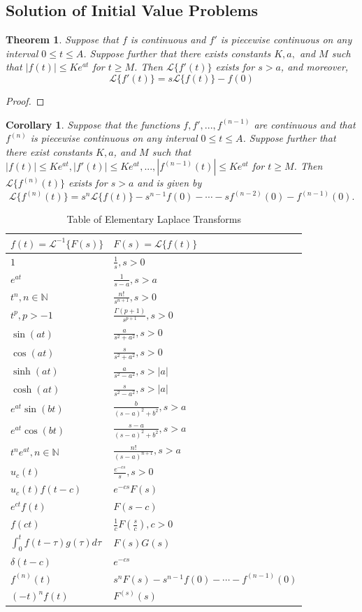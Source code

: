 \documentclass[10pt]{report}
\newtheorem{thm3}{Theorem}[subsection]
\newtheorem{cor3}{Corollary}[subsection]
\begin{document}
\subsection{Solution of Initial Value Problems}
\begin{thm3}
Suppose that $f$ is continuous and $f'$ is piecewise continuous on any interval $0\leq t\leq A$. Suppose further that there exists constants $K, a,$ and $M$ such that $|f(t)|\leq Ke^{at}$ for $t\geq M$. Then $\mathcal{L}\{f'(t)\}$ exists for $s>a$, and moreover,
$$\mathcal{L}\{f'(t)\}=s\mathcal{L}\{f(t)\} - f(0)$$
\end{thm3}
\begin{proof}

\end{proof}
\begin{cor3}
Suppose that the functions $f, f', ..., f^{(n-1)}$ are continuous and that $f^{(n)}$ is piecewise continuous on any interval $0\leq t\leq A$. Suppose further that there exist constants $K,a$, and $M$ such that $|f(t)|\leq Ke^{at}, |f'(t)|\leq Ke^{at},...,|f^{(n-1)}(t)|\leq Ke^{at}$ for $t\geq M$. Then $\mathcal{L}\{f^{(n)}(t)\}$ exists for $s>a$ and is given by
$$\mathcal{L}\{f^{(n)}(t)\}=s^n\mathcal{L}\{f(t)\}-s^{n-1}f(0)-\cdots - sf^{(n-2)}(0)-f^{(n-1)}(0).$$
\end{cor3}
\begin{table}
\caption{Table of Elementary Laplace Transforms}
\begin{tabular}{l l}
\hline
$f(t)=\mathcal{L}^{-1}\{F(s)\}$ & $F(s) = \mathcal{L}\{f(t)\}$\\
\hline \hline
$1$ & $\frac{1}{s}, s>0$\\
$e^{at}$ & $\frac{1}{s-a}, s>a$\\
$t^n, n\in \mathbb{N}$ & $\frac{n!}{s^{n+1}}, s>0$\\
$t^p, p>-1$ & $\frac{\Gamma(p+1)}{s^{p+1}}, s>0$\\
$\sin(at)$ & $\frac{a}{s^2+a^2}, s>0$\\
$\cos(at)$ & $\frac{s}{s^2+a^2}, s>0$\\
$\sinh(at)$ & $\frac{a}{s^2-a^2}, s>|a|$\\
$\cosh(at)$ & $\frac{s}{s^2-a^2}, s>|a|$\\
$e^{at}\sin(bt)$ & $\frac{b}{(s-a)^2+b^2}, s>a$\\
$e^{at}\cos(bt)$ & $\frac{s-a}{(s-a)^2+b^2}, s>a$\\
$t^ne^{at}, n\in\mathbb{N}$ & $\frac{n!}{(s-a)^{n+1}}, s>a$\\
$u_c(t)$ & $\frac{e^{-cs}}{s}, s>0$\\
$u_c(t)f(t-c)$ & $e^{-cs}F(s)$\\
$e^{ct}f(t)$ & $F(s-c)$\\
$f(ct)$ & $\frac{1}{c}F\left(\frac{s}{c}\right), c>0$\\
$\int_0^t f(t-\tau)g(\tau)d\tau$ & $F(s)G(s)$\\
$\delta(t-c)$ & $e^{-cs}$\\
$f^{(n)}(t)$ & $s^nF(s)-s^{n-1}f(0)-\cdots - f^{(n-1)}(0)$\\
$(-t)^nf(t)$ & $F^{(s)}(s)$\\
\end{tabular}
\end{table}
\end{document}
